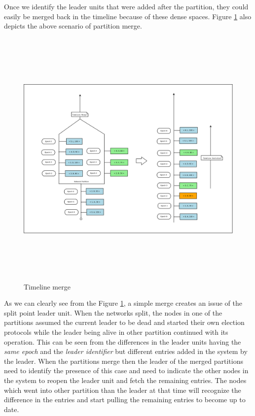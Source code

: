 \documentclass[12pt,a4paper,twoside,openright]{book}
\begin{document}
\par Once we identify the leader units that were added after the partition, they could easily be merged back in the timeline because of these dense spaces. Figure \ref{fig:timelineMerge} also depicts the above scenario of partition merge.



\begin{figure}[H]
	\includegraphics[width=14cm, height= 13cm]{timeline-merge}
	
	\caption{Timeline merge}
	\label{fig:timelineMerge}
\end{figure}


\newpage As we can clearly see from the Figure \ref{fig:timelineMerge}, a simple merge creates an issue of the split point leader unit. When the networks split, the nodes in one of the partitions assumed the current leader to be dead and started their own election protocols while the leader being alive in other partition continued with its operation. This can be seen from the differences in the leader units having the \textit{same epoch} and the \textit{leader identifier}  but different entries added in the system by the leader. When the partitions merge then the leader of the merged partitions need to identify the presence of this case and need to indicate the other nodes in the system to reopen the leader unit and fetch the remaining entries. The nodes which went into other partition than the leader at that time will recognize the difference in the entries and start pulling the remaining entries to become up to date.
\end{document}
